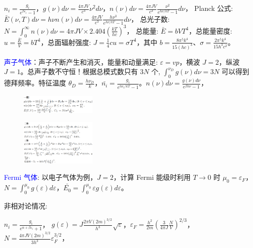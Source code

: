 \documentclass[a4paper,8pt]{extarticle} %
\newcommand{\bluetext}[1]{\textcolor{blue}{#1}}
\begin{document}
\begin{multicols}{3}
$n_i = \frac{g_i}{e^{\beta\varepsilon_i}-1}$，$g(\nu)d\nu = \frac{4\pi JV}{c^3}\nu^2d\nu$，$n(\nu)d\nu = \frac{4\pi JV}{c^3}\frac{\nu^2}{e^{h\nu/kT}-1}d\nu$，
Planck 公式: $\bar{E}(\nu,T)d\nu = h\nu n(\nu)d\nu = \frac{4\pi JV}{c^3}\frac{h\nu^3}{e^{h\nu/kT}-1}d\nu$，
总光子数: $N=\int_0^{\infty}n(\nu)d\nu=4\pi JV \times 2.404\left(\frac{kT}{hc}\right)^3$，
总能量: $\bar{E} = bVT^4$，总能量密度: $u = \frac{\bar{E}}{V} = bT^4$，总面辐射强度: $J = \frac{1}{4}cu = \sigma T^4$，其中 $b = \frac{8\pi^5k^4}{15(hc)^3}$、$\sigma = \frac{2\pi^5k^4}{15h^3c^2}$。

\bluetext{声子气体}：声子不断产生和消灭，能量和动量满足: $\varepsilon = vp$，横波 $J = 2$，纵波 $J = 1$。总声子数不守恒！根据总模式数只有 $3N$ 个, $\int_0^{\nu_D} g(\nu)d\nu = 3N$ 可以得到德拜频率。特征温度 $\theta_D = \frac{h\nu_D}{k}$，$\bar{n_i} = \frac{g_i}{e^{h\nu_i/kT}-1}$。$n(\nu)d\nu = \frac{g(\nu)d\nu}{e^{\beta h\nu}-1}$，

\begin{figure}[H]
    \vspace{-0.3cm}
    \centering
    \includegraphics[width=0.33\textwidth]{images/4.png}
    \vspace{-0.6cm}
\end{figure}
\begin{figure}[H]
    \vspace{-0.3cm}
    \centering
    \includegraphics[width=0.33\textwidth]{images/5.png}
    \vspace{-0.6cm}
\end{figure}

\bluetext{Fermi 气体}: 以电子气体为例，$J = 2$，计算 Fermi 能级时利用 $T \to 0$ 时 $\mu_0 = \varepsilon_F$，$N = \int_0^{\mu_0}g(\varepsilon)d\varepsilon$，$\bar{E_0} = \int_0^{\mu_0}\varepsilon g(\varepsilon)d\varepsilon$。

非相对论情况:

$n_i = \frac{g_i}{e^{\alpha+\beta\varepsilon_i}+1}$，
$g(\varepsilon) = J\frac{2\pi V(2m)^{3/2}}{h^3}\sqrt{\varepsilon}$，$\varepsilon_F = \frac{h^2}{2m}\left(\frac{3}{4\pi J}\frac{N}{V}\right)^{2/3}$，
$N = \frac{4\pi JV(2m)^{3/2}}{3h^3}\varepsilon_F^{3/2}$，


\end{multicols}
\end{document}
